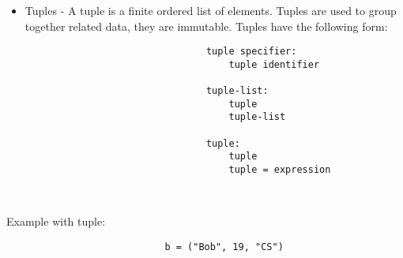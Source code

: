 \documentclass[./LRM_main.tex]{subfiles}
\begin{document}
\begin{itemize}
\begin{lstlisting}
\end{lstlisting}
        

    \item Tuples - A tuple is a finite ordered list of elements. Tuples are used to group together related data, they are immutable. Tuples have the following form:
    \begin{lstlisting}
                                tuple specifier:
                                    tuple identifier
                                    
                                tuple-list:
                                    tuple
                                    tuple-list
                                    
                                tuple:
                                    tuple
                                    tuple = expression
                                    
                                    
    \end{lstlisting}
    
\end{itemize}

Example with tuple:
\begin{lstlisting}
                            b = ("Bob", 19, "CS")
\end{lstlisting}



\end{document}
